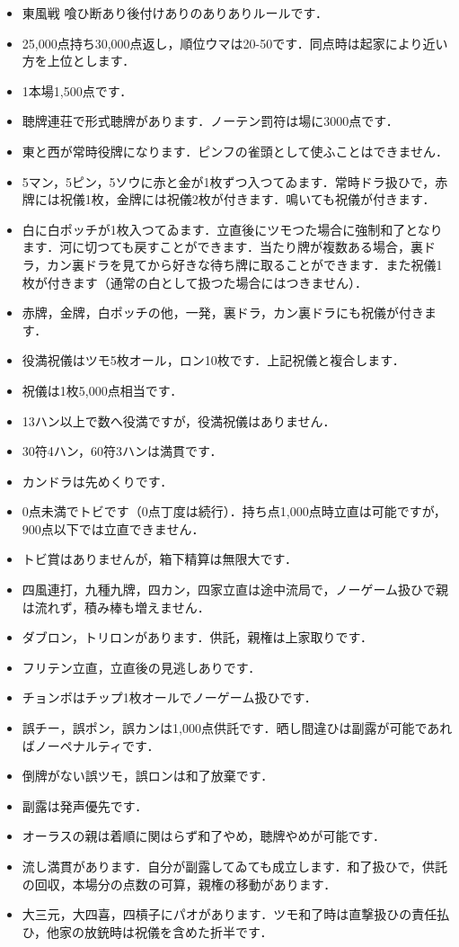 \documentclass[uplatex]{jsarticle}
\theoremstyle{definition}
\begin{document}
\begin{itemize}
    \item 東風戦 喰ひ断あり後付けありのありありルールです．
    \item 25,000点持ち30,000点返し，順位ウマは20-50です．同点時は起家により近い方を上位とします．
    \item 1本場1,500点です．
    \item 聴牌連荘で形式聴牌があります．ノーテン罰符は場に3000点です．
    \item 東と西が常時役牌になります．ピンフの雀頭として使ふことはできません．
    \item 5マン，5ピン，5ソウに赤と金が1枚ずつ入つてゐます．常時ドラ扱ひで，赤牌には祝儀1枚，金牌には祝儀2枚が付きます．鳴いても祝儀が付きます．
    \item 白に白ポッチが1枚入つてゐます．立直後にツモつた場合に強制和了となります．河に切つても戻すことができます．当たり牌が複数ある場合，裏ドラ，カン裏ドラを見てから好きな待ち牌に取ることができます．また祝儀1枚が付きます（通常の白として扱つた場合にはつきません）．
    \item 赤牌，金牌，白ポッチの他，一発，裏ドラ，カン裏ドラにも祝儀が付きます．
    \item 役満祝儀はツモ5枚オール，ロン10枚です．上記祝儀と複合します．
    \item 祝儀は1枚5,000点相当です．
    \item 13ハン以上で数へ役満ですが，役満祝儀はありません．
    \item 30符4ハン，60符3ハンは満貫です．
    \item カンドラは先めくりです．
    \item 0点未満でトビです（0点丁度は続行）．持ち点1,000点時立直は可能ですが，900点以下では立直できません．
    \item トビ賞はありませんが，箱下精算は無限大です．
    \item 四風連打，九種九牌，四カン，四家立直は途中流局で，ノーゲーム扱ひで親は流れず，積み棒も増えません．
    \item ダブロン，トリロンがあります．供託，親権は上家取りです．
    \item フリテン立直，立直後の見逃しありです．
    \item チョンボはチップ1枚オールでノーゲーム扱ひです．
    \item 誤チー，誤ポン，誤カンは1,000点供託です．晒し間違ひは副露が可能であればノーペナルティです．
    \item 倒牌がない誤ツモ，誤ロンは和了放棄です．
    \item 副露は発声優先です．
    \item オーラスの親は着順に関はらず和了やめ，聴牌やめが可能です．
    \item 流し満貫があります．自分が副露してゐても成立します．和了扱ひで，供託の回収，本場分の点数の可算，親権の移動があります．
    \item 大三元，大四喜，四槓子にパオがあります．ツモ和了時は直撃扱ひの責任払ひ，他家の放銃時は祝儀を含めた折半です．
\end{itemize}
\end{document}
